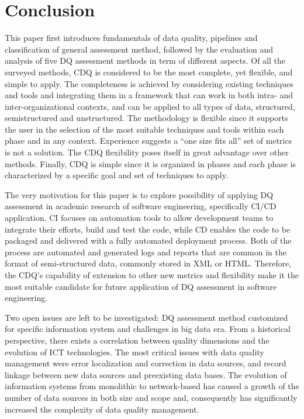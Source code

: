 \documentclass[pdftex,english,oribibl]{llncs}
\begin{document}
\section{Conclusion}
This paper first introduces fundamentals of data quality, pipelines and classification of general assessment method, followed by the evaluation and analysis of five DQ assessment methods in term of different aspects.
Of all the surveyed methods, CDQ is considered to be the most complete, yet flexible, and simple to apply.
The completeness is achieved by considering existing techniques and tools and integrating them in a framework that can work in both intra- and inter-organizational contexts, and can be applied to all types of data, structured, semistructured and unstructured.
The methodology is flexible since it supports the user in the selection of the most suitable techniques and tools within each phase and in any context.
Experience suggests a “one size fits all” set of metrics is not a solution. The CDQ flexibility poses itself in great advantage over other methods.
Finally, CDQ is simple since it is organized in phases and each phase is characterized by a specific goal and set of techniques to apply.

The very motivation for this paper is to explore possibility of applying DQ assessment in academic research of software engineering, specifically CI/CD application. CI focuses on automation tools to allow development teams to integrate their efforts, build and test the code, while CD enables the code to be packaged and delivered with a fully automated deployment process. Both of the process are automated and generated logs and reports that are common in the format of semi-structured data, commonly stored in XML or HTML.
Therefore, the CDQ's capability of extension to other new metrics and flexibility make it the most suitable candidate for future application of DQ assessment in software engineering.

Two open issues are left to be investigated: DQ assessment method customized for specific information system and challenges in big data era.
From a historical perspective, there exists a correlation between quality dimensions and the evolution of ICT technologies.
The most critical issues with data quality management were error localization and correction in data sources, and record linkage between new data sources and preexisting data bases.
The evolution of information systems from monolithic to network-based has caused a growth of the number of data sources in both size and scope and, consequently has significantly increased the complexity of data quality management.
\end{document}
